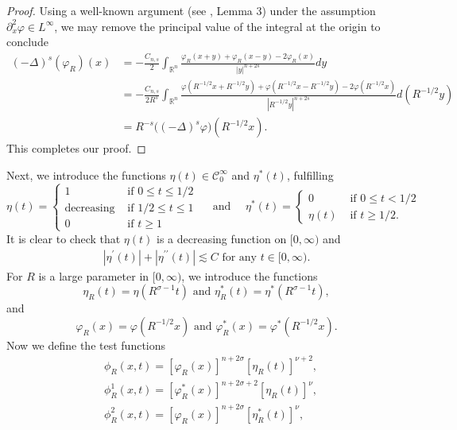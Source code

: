 \documentclass[11pt,reqno]{amsart}
\newcommand{\tron}[1]{\left( #1 \right)}
\numberwithin{equation}{section}
\theoremstyle{plain}
\begin{document}
\begin{proof}
    Using a well-known argument (see \cite{Anhblowup}, Lemma 3) under the assumption $\partial^{2}_x\varphi\in L^{\infty}$, we may remove the principal value of the integral at the origin to conclude
$$
\begin{aligned}
(-\Delta)^s(\varphi_R)(x) &=-\frac{C_{n, s}}{2} \int_{\mathbb{R}^n} \frac{\varphi_R(x+y)+\varphi_R(x-y)-2 \varphi_R(x)}{|y|^{n+2 s}} d y \\
&=-\frac{C_{n, s}}{2 R^{s}} \int_{\mathbb{R}^n} \frac{\varphi\left(R^{-1/2} x+R^{-1/2} y\right)+\varphi\left(R^{-1/2} x-R^{-1/2} y\right)-2 \varphi\left(R^{-1/2} x\right)}{\left|R^{-1/2} y\right|^{n+2 s}} d\left(R^{-1/2} y\right) \\
&=R^{-s}\big((-\Delta)^s \varphi\big)\left(R^{-1/2} x\right).
\end{aligned}
$$
This completes our proof.
\end{proof}
Next, we introduce the functions $\eta(t) \in \mathcal{C}_0^{\infty}$ and $\eta^*(t)$, fulfilling 
\[
\eta(t)=
\begin{cases}
    1 &\text{ if }0\leq t\leq 1/2\\
    \text{decreasing} &\text{ if }1/2\leq t\leq 1\\
    0 &\text{ if }t\geq 1
\end{cases}
\quad \text{ and }\quad
\eta^*(t)=
\begin{cases}
0 &\text{ if }0\leq t<1/2\\
\eta(t) &\text{ if }t\geq 1/2.
\end{cases}
\]
It is clear to check that $\eta(t)$ is a decreasing function on $[0,\infty)$ and
\begin{equation}\label{as2}
\begin{aligned}
|\eta^{\prime}(t)|+|\eta^{\prime\prime}(t)|\lesssim C\text{ for any $t\in [0,\infty)$}.
\end{aligned}
\end{equation}
For $R$ is a large parameter in $[0,\infty)$, we introduce the functions
\[
\eta_R(t)=\eta\tron{R^{\sigma-1}t}\text{ and }\eta^*_{R}(t)=\eta^*\tron{R^{\sigma-1}t},
\]
and 
\[
\varphi_R(x)=\varphi\tron{R^{-1/2}x}\text{ and }\varphi^*_R(x)=\varphi^*\tron{R^{-1/2}x}.
\]
Now we define the test functions
\begin{equation}\label{testfunc}
\begin{aligned}
&\phi_{R}(x,t)=\left[\varphi_R(x)\right]^{n+2\sigma}[\eta_{R}(t)]^{\nu+2},\\
&\phi^1_{R}(x,t)=\left[\varphi^*_R(x)\right]^{n+2\sigma+2}[\eta_{R}(t)]^{\nu},\\
&\phi^2_{R}(x,t)=\left[\varphi_R(x)\right]^{n+2\sigma}[\eta^*_{R}(t)]^{\nu},
\end{aligned}
\end{equation}
\end{document}
